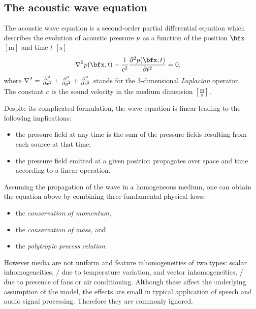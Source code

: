 
\subsection{The acoustic wave equation}\label{subsec:acoustics:waveq}
The acoustic wave equation is a second-order partial differential equation which describes the evolution of acoustic pressure $\pressure$
as a function of the position $\positionMicrophone$ $[\si{\metre}]$ and time $t$ $[\si{\second}]$
\begin{equation}
    \label{eq:acoustics:wave}
    \knabla^2 \pressureSpaceTime - \frac{1}{\speedOfSound^2} \kpderiv[2]{\pressureSpaceTime}{t} = 0
    ,
\end{equation}
where $\knabla^2 = \kpderiv[2]{}{x} + \kpderiv[2]{}{y} + \kpderiv[2]{}{z}$ stands for the 3-dimensional \textit{Laplacian} operator.
The constant $\speedOfSound$ is the sound velocity in the medium  dimension $[\frac{\si{\metre}}{\si{\second}}]$.

Despite its complicated formulation, the wave equation is linear leading to the following implications:
\begin{itemize}
    \item the pressure field at any time is the sum of the pressure fields resulting from each source at that time;
    \item the pressure field emitted at a given position propagates over space and time according to a linear operation.
\end{itemize}

Assuming the propagation of the wave in a homogeneous medium, one can obtain the equation above by combining three fundamental physical laws:
\begin{itemize}
    \item the \textit{conservation of momentum},
    \item the \textit{conservation of mass}, and
    \item the \textit{polytropic process relation}.
\end{itemize}
However media are not uniform and feature inhomogeneities of two types:
scalar inhomogeneities, \eg/ due to temperature variation,
and vector inhomogeneities, \eg/ due to presence of fans or air conditioning.
Although these affect the underlying assumption of the model, the effects are small in typical application of speech and audio signal processing.
Therefore they are commonly ignored.

